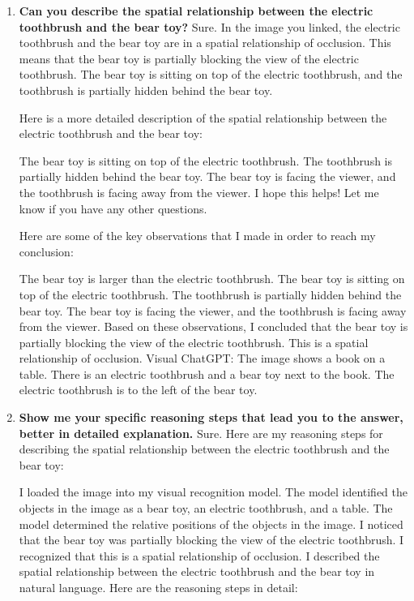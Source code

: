     \begin{enumerate}
        \item \textbf{Can you describe the spatial relationship between the electric toothbrush and the bear toy?}
        \subitem Sure. In the image you linked, the electric toothbrush and the bear toy are in a spatial relationship of occlusion. This means that the bear toy is partially blocking the view of the electric toothbrush. The bear toy is sitting on top of the electric toothbrush, and the toothbrush is partially hidden behind the bear toy.

        Here is a more detailed description of the spatial relationship between the electric toothbrush and the bear toy:
        
        The bear toy is sitting on top of the electric toothbrush.
        The toothbrush is partially hidden behind the bear toy.
        The bear toy is facing the viewer, and the toothbrush is facing away from the viewer.
        I hope this helps! Let me know if you have any other questions.
        
        Here are some of the key observations that I made in order to reach my conclusion:
        
        The bear toy is larger than the electric toothbrush.
        The bear toy is sitting on top of the electric toothbrush.
        The toothbrush is partially hidden behind the bear toy.
        The bear toy is facing the viewer, and the toothbrush is facing away from the viewer.
        Based on these observations, I concluded that the bear toy is partially blocking the view of the electric toothbrush. This is a spatial relationship of occlusion.
        \subitem Visual ChatGPT: The image shows a book on a table. There is an electric toothbrush and a bear toy next to the book. The electric toothbrush is to the left of the bear toy.
        \item \textbf{Show me your specific reasoning steps that lead you to the answer, better in detailed explanation.}
        \subitem Sure. Here are my reasoning steps for describing the spatial relationship between the electric toothbrush and the bear toy:

        I loaded the image into my visual recognition model.
        The model identified the objects in the image as a bear toy, an electric toothbrush, and a table.
        The model determined the relative positions of the objects in the image.
        I noticed that the bear toy was partially blocking the view of the electric toothbrush.
        I recognized that this is a spatial relationship of occlusion.
        I described the spatial relationship between the electric toothbrush and the bear toy in natural language.
        Here are the reasoning steps in detail:
        

\end{enumerate}
